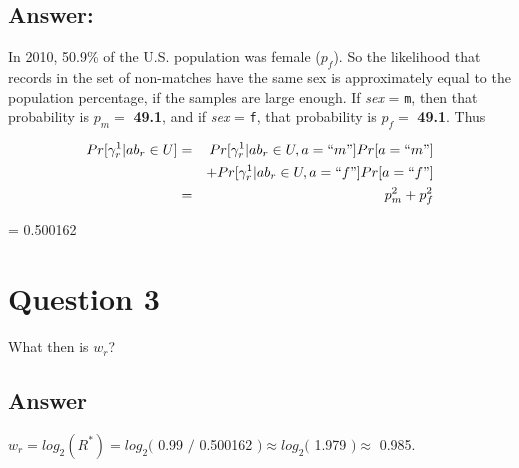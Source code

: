 \documentclass[]{article}
\begin{document}
\subsection{Answer:}\label{answer-1}

In 2010, 50.9\% of the U.S. population was female (\(p_f\)). So the
likelihood that records in the set of non-matches have the same sex is
approximately equal to the population percentage, if the samples are
large enough. If \emph{sex} = \texttt{m}, then that probability is
\(p_m =\) \textbf{49.1}, and if \emph{sex} = \texttt{f}, that
probability is \(p_f =\) \textbf{49.1}. Thus

\begin{eqnarray}
Pr [ \gamma^1_r | ab_r \in U] & = & Pr [ \gamma^1_r | ab_r \in U , a = ``m"] Pr[ a = ``m"] \nonumber\\
                              &   & + Pr [ \gamma^1_r | ab_r \in U , a = ``f"] Pr[ a = ``f"] \nonumber\\
                              & = & p_m^2 + p_f^2 \nonumber\\
\end{eqnarray}

= 0.500162

\section{Question 3}\label{question-3}

What then is \(w_r\)?

\subsection{Answer}\label{answer-2}

\(w_r = log_2(R^*) = log_2(\) 0.99 \(/\) 0.500162 \() \approx log_2(\)
1.979 \() \approx\) 0.985.
\end{document}
